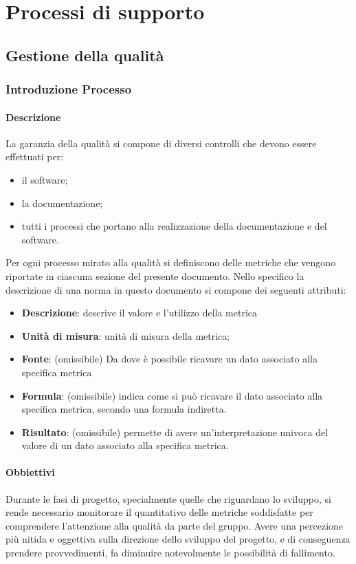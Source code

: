 \section{Processi di supporto}
	\subsection{Gestione della qualità}
		\subsubsection{Introduzione Processo}
			\paragraph{Descrizione}
				La garanzia della qualità si compone di diversi controlli che devono essere effettuati per:
				\begin{itemize}
					\item il software;
					\item la documentazione;
					\item tutti i processi che portano alla realizzazione della documentazione e del software.
				\end{itemize}
				Per ogni processo mirato alla qualità si definiscono delle metriche che vengono riportate in ciascuna sezione del presente documento. Nello specifico la descrizione di una norma in questo documento si compone dei seguenti attributi:
				\begin{itemize}
					\item\textbf{Descrizione}: descrive il valore e l’utilizzo della metrica
					\item\textbf{Unità di misura}: unità di misura della metrica;
					\item\textbf{Fonte}: (omissibile) Da dove è possibile ricavare un dato associato alla specifica metrica	
					\item\textbf{Formula}: (omissibile) indica come si può ricavare il dato associato alla specifica metrica, secondo una formula indiretta.
					\item\textbf{Risultato}: (omissibile) permette di avere un’interpretazione univoca del valore di un dato associato alla specifica metrica.
				\end{itemize}
			\paragraph{Obbiettivi}
				Durante le fasi di progetto, specialmente quelle che riguardano lo sviluppo, si rende necessario monitorare il quantitativo delle metriche soddisfatte per comprendere l'attenzione alla qualità da parte del gruppo. Avere una percezione più nitida e oggettiva sulla direzione dello sviluppo del progetto, e di conseguenza prendere provvedimenti, fa diminuire notevolmente le possibilità di fallimento.
